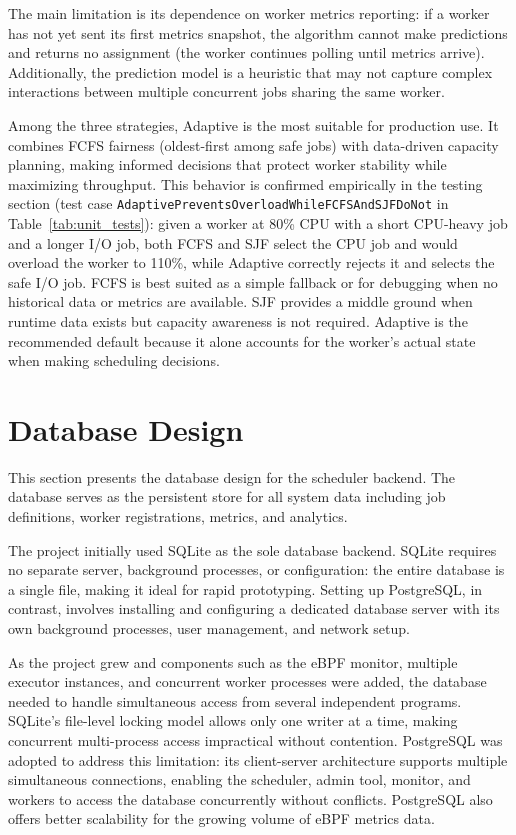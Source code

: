 The main limitation is its dependence on worker metrics reporting: if a worker has not yet sent its first metrics snapshot, the algorithm cannot make predictions and returns no assignment (the worker continues polling until metrics arrive). Additionally, the prediction model is a heuristic that may not capture complex interactions between multiple concurrent jobs sharing the same worker.

Among the three strategies, Adaptive is the most suitable for production use. It combines FCFS fairness (oldest-first among safe jobs) with data-driven capacity planning, making informed decisions that protect worker stability while maximizing throughput. This behavior is confirmed empirically in the testing section (test case \texttt{AdaptivePreventsOverloadWhileFCFSAndSJFDoNot} in Table~\ref{tab:unit_tests}): given a worker at 80\% CPU with a short CPU-heavy job and a longer I/O job, both FCFS and SJF select the CPU job and would overload the worker to 110\%, while Adaptive correctly rejects it and selects the safe I/O job. FCFS is best suited as a simple fallback or for debugging when no historical data or metrics are available. SJF provides a middle ground when runtime data exists but capacity awareness is not required. Adaptive is the recommended default because it alone accounts for the worker's actual state when making scheduling decisions.

\section{Database Design}

This section presents the database design for the scheduler backend. The database serves as the persistent store for all system data including job definitions, worker registrations, metrics, and analytics.

The project initially used SQLite as the sole database backend. SQLite requires no separate server, background processes, or configuration: the entire database is a single file, making it ideal for rapid prototyping. Setting up PostgreSQL, in contrast, involves installing and configuring a dedicated database server with its own background processes, user management, and network setup.

As the project grew and components such as the eBPF monitor, multiple executor instances, and concurrent worker processes were added, the database needed to handle simultaneous access from several independent programs. SQLite's file-level locking model allows only one writer at a time, making concurrent multi-process access impractical without contention. PostgreSQL was adopted to address this limitation: its client-server architecture supports multiple simultaneous connections, enabling the scheduler, admin tool, monitor, and workers to access the database concurrently without conflicts. PostgreSQL also offers better scalability for the growing volume of eBPF metrics data.

